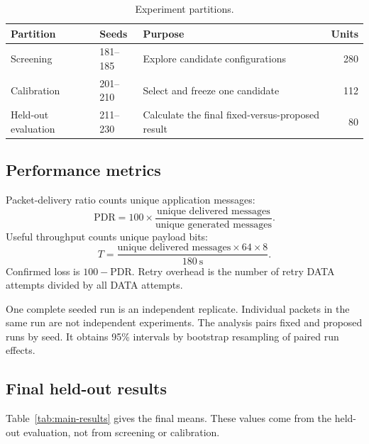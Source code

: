 \documentclass[11pt]{article}
\begin{document}
\begin{table}[H]
\centering\small
\caption{Experiment partitions.}\label{tab:partitions}
\begin{tabular}{l l p{7.2cm} r}
\toprule
Partition & Seeds & Purpose & Units \\
\midrule
Screening & 181--185 & Explore candidate configurations & 280 \\
Calibration & 201--210 & Select and freeze one candidate & 112 \\
Held-out evaluation & 211--230 & Calculate the final fixed-versus-proposed result & 80 \\
\bottomrule
\end{tabular}
\end{table}

\subsection{Performance metrics}\label{sec:res-metrics}
\noindent
Packet-delivery ratio counts unique application messages:
\begin{equation}
\mathrm{PDR}=100\times\frac{\text{unique delivered messages}}{\text{unique generated messages}}.
\end{equation}
Useful throughput counts unique payload bits:
\begin{equation}
T=\frac{\text{unique delivered messages}\times64\times8}{180\ \mathrm{s}}.
\end{equation}
Confirmed loss is $100-\mathrm{PDR}$.
Retry overhead is the number of retry DATA attempts divided by all DATA attempts.

One complete seeded run is an independent replicate.
Individual packets in the same run are not independent experiments.
The analysis pairs fixed and proposed runs by seed.
It obtains 95\% intervals by bootstrap resampling of paired run effects.

\clearpage
\subsection{Final held-out results}\label{sec:res-main}
\noindent
Table~\ref{tab:main-results} gives the final means.
These values come from the held-out evaluation, not from screening or calibration.
\end{document}
